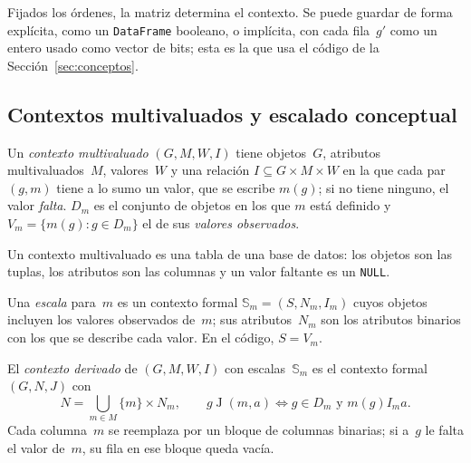 \begin{observacion}[representación]\label{obs:representacion}
Fijados los órdenes, la matriz determina el contexto. Se puede guardar de forma explícita, como un \texttt{DataFrame} booleano, o implícita, con cada fila~$g'$ como un entero usado como vector de bits; esta es la que usa el código de la Sección~\ref{sec:conceptos}.
\end{observacion}


\subsection{Contextos multivaluados y escalado conceptual}
\label{sec:escalado}

\begin{definicion}\label{def:multivaluado}
Un \emph{contexto multivaluado} $(G, M, W, I)$ tiene objetos~$G$, atributos multivaluados~$M$, valores~$W$ y una relación $I \subseteq G \times M \times W$ en la que cada par $(g, m)$ tiene a lo sumo un valor, que se escribe $m(g)$; si no tiene ninguno, el valor \emph{falta}. $D_m$ es el conjunto de objetos en los que $m$ está definido y $V_m = \{ m(g) : g \in D_m \}$ el de sus \emph{valores observados}.
\end{definicion}

\begin{observacion}\label{obs:relacional}
Un contexto multivaluado es una tabla de una base de datos: los objetos son las tuplas, los atributos son las columnas y un valor faltante es un \texttt{NULL}.
\end{observacion}

\begin{definicion}\label{def:escala}
Una \emph{escala} para~$m$ es un contexto formal $\mathbb{S}_m = (S, N_m, I_m)$ cuyos objetos incluyen los valores observados de~$m$; sus atributos~$N_m$ son los atributos binarios con los que se describe cada valor. En el código, $S = V_m$.
\end{definicion}

\begin{definicion}\label{def:derivado}
El \emph{contexto derivado} de $(G, M, W, I)$ con escalas~$\mathbb{S}_m$ es el contexto formal $(G, N, J)$ con
\[
  N = \bigcup_{m \in M} \{m\} \times N_m, \qquad g \mathrel{J} (m, a) \iff g \in D_m \text{ y } m(g) \mathrel{I_m} a.
\]
Cada columna~$m$ se reemplaza por un bloque de columnas binarias; si a~$g$ le falta el valor de~$m$, su fila en ese bloque queda vacía.
\end{definicion}

